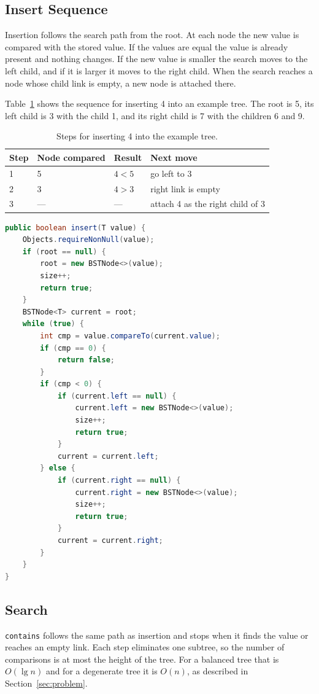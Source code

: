 \subsection{Insert Sequence}
Insertion follows the search path from the root. At each node the new value is compared with the stored value. If the values are equal the value is already present and nothing changes. If the new value is smaller the search moves to the left child, and if it is larger it moves to the right child. When the search reaches a node whose child link is empty, a new node is attached there.

Table~\ref{tab:insert4} shows the sequence for inserting 4 into an example tree. The root is 5, its left child is 3 with the child 1, and its right child is 7 with the children 6 and 9.

\begin{table}[H]
\centering
\small
\caption{Steps for inserting 4 into the example tree.}
\label{tab:insert4}
\begin{tabularx}{\textwidth}{p{1.2cm} p{3.2cm} p{3.4cm} X}
\toprule
Step & Node compared & Result & Next move \\
\midrule
1 & 5 & $4 < 5$ & go left to 3 \\
2 & 3 & $4 > 3$ & right link is empty \\
3 & --- & --- & attach 4 as the right child of 3 \\
\bottomrule
\end{tabularx}
\end{table}

\begin{lstlisting}[language=Java]
public boolean insert(T value) {
    Objects.requireNonNull(value);
    if (root == null) {
        root = new BSTNode<>(value);
        size++;
        return true;
    }
    BSTNode<T> current = root;
    while (true) {
        int cmp = value.compareTo(current.value);
        if (cmp == 0) {
            return false;
        }
        if (cmp < 0) {
            if (current.left == null) {
                current.left = new BSTNode<>(value);
                size++;
                return true;
            }
            current = current.left;
        } else {
            if (current.right == null) {
                current.right = new BSTNode<>(value);
                size++;
                return true;
            }
            current = current.right;
        }
    }
}
\end{lstlisting}

\subsection{Search}
\texttt{contains} follows the same path as insertion and stops when it finds the value or reaches an empty link. Each step eliminates one subtree, so the number of comparisons is at most the height of the tree. For a balanced tree that is $O(\lg n)$ and for a degenerate tree it is $O(n)$, as described in Section~\ref{sec:problem}.

